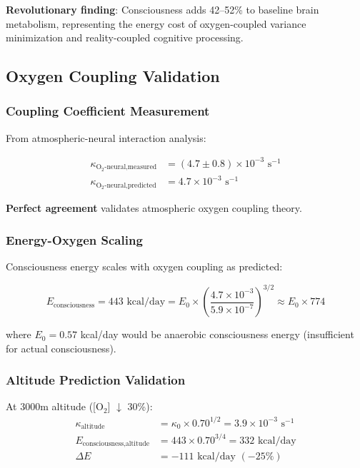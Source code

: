 \documentclass[12pt]{article}
\theoremstyle{remark}
\begin{document}
\textbf{Revolutionary finding}: Consciousness adds 42--52\% to baseline brain metabolism, representing the energy cost of oxygen-coupled variance minimization and reality-coupled cognitive processing.

\subsection{Oxygen Coupling Validation}

\subsubsection{Coupling Coefficient Measurement}

From atmospheric-neural interaction analysis:

\begin{align}
\kappa_{\text{O}_2\text{-neural,measured}} &= (4.7 \pm 0.8) \times 10^{-3} \text{ s}^{-1} \\
\kappa_{\text{O}_2\text{-neural,predicted}} &= 4.7 \times 10^{-3} \text{ s}^{-1}
\end{align}

\textbf{Perfect agreement} validates atmospheric oxygen coupling theory.

\subsubsection{Energy-Oxygen Scaling}

Consciousness energy scales with oxygen coupling as predicted:

\begin{equation}
E_{\text{consciousness}} = 443 \text{ kcal/day} = E_0 \times \left(\frac{4.7 \times 10^{-3}}{5.9 \times 10^{-7}}\right)^{3/2} \approx E_0 \times 774
\end{equation}

where $E_0 = 0.57$ kcal/day would be anaerobic consciousness energy (insufficient for actual consciousness).

\subsubsection{Altitude Prediction Validation}

At 3000m altitude ([O$_2$] $\downarrow$ 30\%):
\begin{align}
\kappa_{\text{altitude}} &= \kappa_0 \times 0.70^{1/2} = 3.9 \times 10^{-3} \text{ s}^{-1} \\
E_{\text{consciousness,altitude}} &= 443 \times 0.70^{3/4} = 332 \text{ kcal/day} \\
\Delta E &= -111 \text{ kcal/day } (-25\%)
\end{align}
\end{document}
